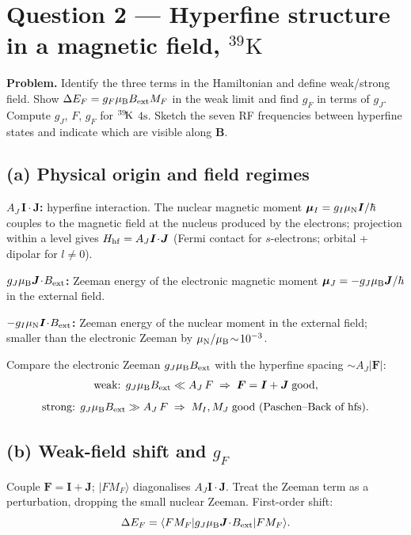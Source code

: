 \documentclass[11pt]{article}
\newcommand{\Bext}{B_{\mathrm{ext}}}
\begin{document}
\section*{Question 2 --- Hyperfine structure in a magnetic field, ${}^{39}\mathrm{K}$}

\textbf{Problem.}
Identify the three terms in the Hamiltonian and define weak/strong field. Show
$\Delta E_{F}=g_{F}\mu_{\rm B}\Bext M_{F}$ in the weak limit and find $g_{F}$ in terms of $g_{J}$.
Compute $g_{J}$, $F$, $g_{F}$ for ${}^{39}\!{\rm K}$ $4\mathrm{s}$.
Sketch the seven RF frequencies between hyperfine states and indicate which are visible along $\bm B$.

\subsection*{(a) Physical origin and field regimes}

\textbf{$A_{J}\,\bm I\!\cdot\!\bm J$:} hyperfine interaction. The nuclear magnetic moment $\bm\mu_{I}=g_{I}\mu_{\rm N}\bm I/\hbar$ couples to the magnetic field at the nucleus produced by the electrons; projection within a level gives $H_{\rm hf}=A_{J}\bm I\!\cdot\!\bm J$ (Fermi contact for $s$-electrons; orbital + dipolar for $l\neq 0$).

\textbf{$g_{J}\mu_{\rm B}\bm J\!\cdot\!\Bext$:} Zeeman energy of the electronic magnetic moment $\bm\mu_{J}=-g_{J}\mu_{\rm B}\bm J/\hbar$ in the external field.

\textbf{$-g_{I}\mu_{\rm N}\bm I\!\cdot\!\Bext$:} Zeeman energy of the nuclear moment in the external field; smaller than the electronic Zeeman by $\mu_{\rm N}/\mu_{\rm B}\!\sim\!10^{-3}$.

Compare the electronic Zeeman $g_{J}\mu_{\rm B}\Bext$ with the hyperfine spacing $\sim A_{J}|\bm F|$:
\[
\text{weak: }g_{J}\mu_{\rm B}\Bext\ll A_{J}\,F\;\Rightarrow\;\bm F=\bm I+\bm J\;\text{good},
\]
\[
\text{strong: }g_{J}\mu_{\rm B}\Bext\gg A_{J}\,F\;\Rightarrow\;M_{I},M_{J}\;\text{good (Paschen--Back of hfs)}.
\]

\subsection*{(b) Weak-field shift and $g_{F}$}

Couple $\bm F=\bm I+\bm J$; $|FM_{F}\rangle$ diagonalises $A_{J}\bm I\!\cdot\!\bm J$. Treat the Zeeman term as a perturbation, dropping the small nuclear Zeeman. First-order shift:
\[
\Delta E_{F}=\langle FM_{F}|g_{J}\mu_{\rm B}\bm J\!\cdot\!\Bext|FM_{F}\rangle.
\]
\end{document}
